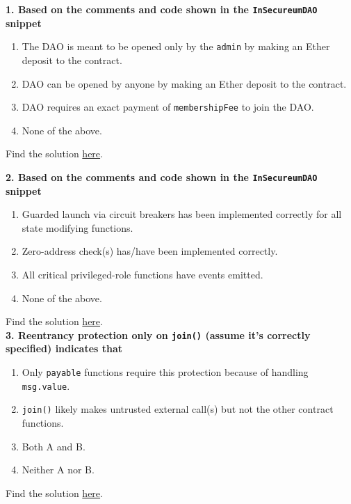 \textbf{1. Based on the comments and code shown in the \texttt{InSecureumDAO} snippet}

\begin{enumerate}[label=\Alph*.]
    \item The DAO is meant to be opened only by the \verb|admin| by making an Ether deposit to the contract.
    \item DAO can be opened by anyone by making an Ether deposit to the contract.
    \item DAO requires an exact payment of \verb|membershipFee| to join the DAO.
    \item None of the above.
\end{enumerate}

Find the solution \hyperref[sec:exam7_q1]{here}.\\

\pagebreak

\textbf{2. Based on the comments and code shown in the \texttt{InSecureumDAO} snippet}

\begin{enumerate}[label=\Alph*.]
    \item Guarded launch via circuit breakers has been implemented correctly for all state modifying functions.
    \item Zero-address check(s) has/have been implemented correctly.
    \item All critical privileged-role functions have events emitted.
    \item None of the above.
\end{enumerate}

Find the solution \hyperref[sec:exam7_q2]{here}.\\

\textbf{3. Reentrancy protection only on \texttt{join()} (assume it's correctly specified) indicates that}

\begin{enumerate}[label=\Alph*.]
    \item Only \verb|payable| functions require this protection because of handling \verb|msg.value|.
    \item\verb|join()| likely makes untrusted external call(s) but not the other contract functions.
    \item Both A and B.
    \item Neither A nor B.
\end{enumerate}

Find the solution \hyperref[sec:exam7_q3]{here}.\\

